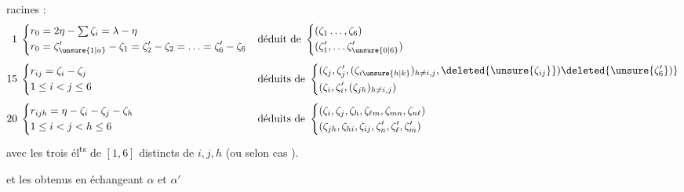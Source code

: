 racines :
\[
\begin{aligned}
1\;&\left\{\begin{aligned}r_0&=2\eta-\textstyle\sum\zeta_i=\lambda-\eta\\
r_0&=\zeta'_{\unsure{1|a}}-\zeta_1=\zeta'_2-\zeta_2=\ldots=\zeta'_6-\zeta_6\end{aligned}\right.
&&\text{déduit de }\left\{\begin{aligned}&(\zeta_1\ldots,\zeta_6)\\&(\zeta'_1,\ldots\zeta'_{\unsure{0|6}})\end{aligned}\right.\\[4pt]
15\;&\left\{\begin{aligned}&r_{ij}=\zeta_i-\zeta_j\\&1\le i<j\le6\end{aligned}\right.
&&\text{déduits de }\left\{\begin{aligned}
&(\zeta_j,\zeta'_j,(\zeta_{i\unsure{h|k}})_{h\ne i,j},\deleted{\unsure{\zeta_{ij}}})\deleted{\unsure{\zeta'_6})}\\
&(\zeta_i,\zeta'_i,(\zeta_{jh})_{h\ne i,j})\end{aligned}\right.\\[4pt]
20\;&\left\{\begin{aligned}&r_{ijh}=\eta-\zeta_i-\zeta_j-\zeta_h\\&1\le i<j<h\le6\end{aligned}\right.
&&\text{déduits de }\left\{\begin{aligned}
&(\zeta_i,\zeta_j,\zeta_h,\zeta_{\ell m},\zeta_{mn},\zeta_{n\ell})\\
&(\zeta_{jh},\zeta_{hi},\zeta_{ij},\zeta'_n,\zeta'_\ell,\zeta'_m)\end{aligned}\right.
\end{aligned}
\]
avec   les trois él\textsuperscript{ts} de $[1,6]$ distincts de $i,j,h$ (ou selon cas ).

et les  obtenus en échangeant $\alpha$ et $\alpha'$
